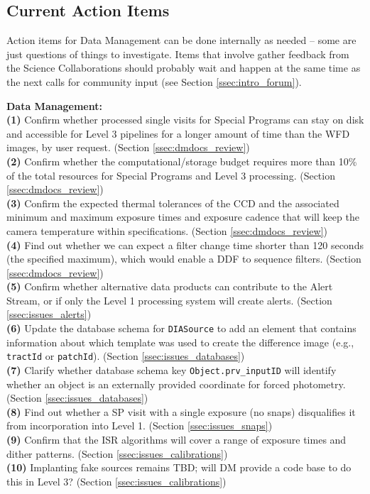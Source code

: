 \documentclass[DM,lsstdraft,toc]{lsstdoc}
\begin{document}
\subsection{Current Action Items}\label{ssec:intro_action}

Action items for Data Management can be done internally as needed -- some are just questions of things to investigate. Items that involve gather feedback from the Science Collaborations should probably wait and happen at the same time as the next calls for community input (see Section \ref{ssec:intro_forum}).

\noindent \textbf{Data Management: } \\
\textbf{(1)} Confirm whether processed single visits for Special Programs can stay on disk and accessible for Level 3 pipelines for a longer amount of time than the WFD images, by user request. (Section \ref{ssec:dmdocs_review}) \\
\textbf{(2)} Confirm whether the computational/storage budget requires more than 10\% of the total resources for Special Programs and Level 3 processing. (Section \ref{ssec:dmdocs_review}) \\
\textbf{(3)} Confirm the expected thermal tolerances of the CCD and the associated minimum and maximum exposure times and exposure cadence that will keep the camera temperature within specifications. (Section \ref{ssec:dmdocs_review}) \\
\textbf{(4)} Find out whether we can expect a filter change time shorter than 120 seconds (the specified maximum), which would enable a DDF to sequence filters. (Section \ref{ssec:dmdocs_review}) \\
\textbf{(5)} Confirm whether alternative data products can contribute to the Alert Stream, or if only the Level 1 processing system will create alerts. (Section \ref{ssec:issues_alerts}) \\
\textbf{(6)} Update the database schema for {\tt DIASource} to add an element that contains information about which template was used to create the difference image (e.g., {\tt tractId} or {\tt patchId}). (Section \ref{ssec:issues_databases}) \\
\textbf{(7)} Clarify whether database schema key {\tt Object.prv\_inputID} will identify whether an object is an externally provided coordinate for forced photometry. (Section \ref{ssec:issues_databases}) \\
\textbf{(8)} Find out whether a SP visit with a single exposure (no snaps) disqualifies it from incorporation into Level 1. (Section \ref{ssec:issues_snaps}) \\
\textbf{(9)} Confirm that the ISR algorithms will cover a range of exposure times and dither patterns. (Section \ref{ssec:issues_calibrations}) \\
\textbf{(10)} Implanting fake sources remains TBD; will DM provide a code base to do this in Level 3? (Section \ref{ssec:issues_calibrations}) \\
\end{document}
